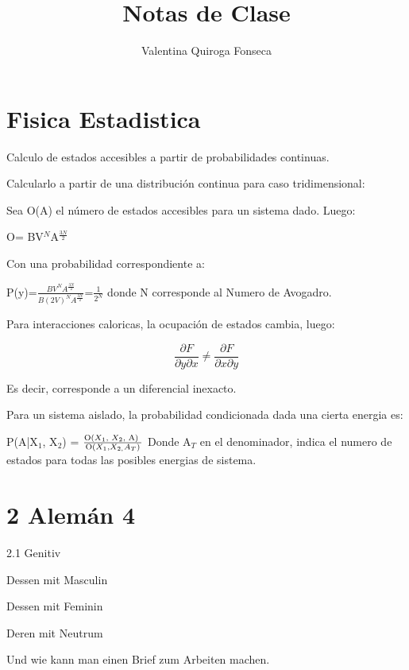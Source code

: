 \documentclass[english]{article}
\begin{document}
\title{Notas de Clase}


\author{Valentina Quiroga Fonseca}

\maketitle

\section{Fisica Estadistica}

Calculo de estados accesibles a partir de probabilidades continuas. 

Calcularlo a partir de una distribución continua para caso tridimensional:

Sea O(A) el número de estados accesibles para un sistema dado. Luego:

O= BV$^{N}$A$^{\frac{3N}{2}}$

Con una probabilidad correspondiente a:

P(y)=$\frac{BV^{N}A^{\frac{3N}{2}}}{B(2V)^{N}A^{\frac{3N}{2}}}$=$\frac{1}{2^{N}}$
donde N corresponde al Numero de Avogadro.

Para interacciones caloricas, la ocupación de estados cambia, luego:

\[
\frac{\partial F}{\partial y\partial x}\neq\frac{\partial F}{\partial x\partial y}
\]


Es decir, corresponde a un diferencial inexacto. 

Para un sistema aislado, la probabilidad condicionada dada una cierta
energia es:

P(A|X$_{1}$, X$_{2}$) = $\frac{\text{O(\ensuremath{X_{1}}, \ensuremath{X_{2}}, A) }}{\text{O}(X_{1},X_{2,}A_{T})}$
Donde A$_{T}$ en el denominador, indica el numero de estados para
todas las posibles energias de sistema.


\section*{2 Alemán 4}

2.1 Genitiv

Dessen mit Masculin

Dessen mit Feminin

Deren mit Neutrum

Und wie kann man einen Brief zum Arbeiten machen.
\end{document}
